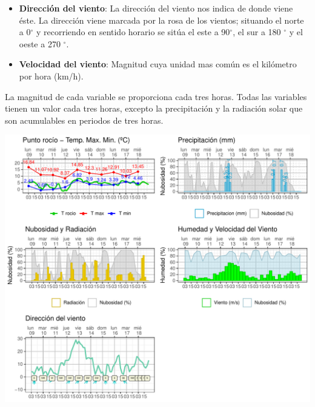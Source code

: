 \documentclass[[a4paper,landscape]{article}\usepackage[]{graphicx}\usepackage[]{color}
\begin{document}
\begin{itemize}
    \item \textbf{Direcci\'on del viento}: La dirección del viento nos indica de donde viene éste.
     La dirección viene marcada por la rosa de los vientos; situando el norte a 0$^\circ$
    y recorriendo en sentido horario se sitúa el este a  90$^\circ$, el sur a 180 $^\circ$ y el oeste a 270 $^\circ$.

    \item \textbf{Velocidad del viento}: Magnitud cuya unidad mas común es el kilómetro por hora (km/h).

\end{itemize}



\vspace{1cm}
\begin{example}
La magnitud de cada variable se proporciona cada tres horas. Todas las variables tienen un valor cada tres horas,
excepto la precipitaci\'on y la radiaci\'on solar que son acumulables en periodos de tres horas.\\
\end{example}

\clearpage
\newpage




\begin{center}
    \includegraphics[width=\textwidth]{./figure/Figresumen-1.pdf}
\end{center}
\end{document}
